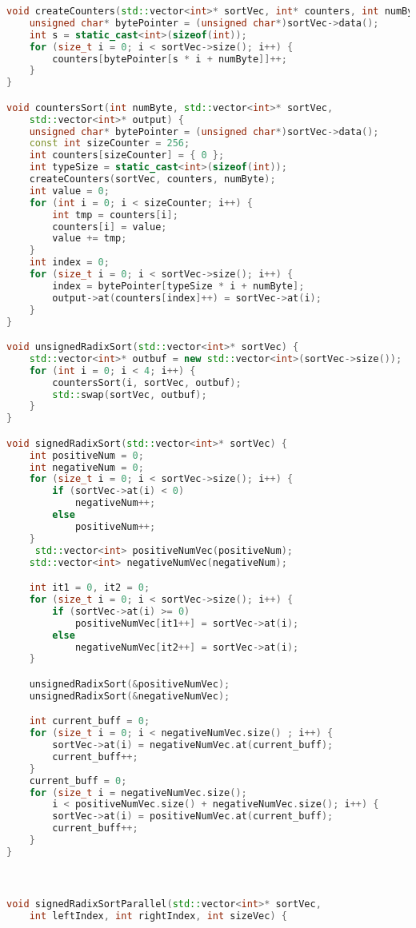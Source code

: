 \documentclass{report}
\begin{document}
\begin{lstlisting}[language=C++]
void createCounters(std::vector<int>* sortVec, int* counters, int numByte) {
    unsigned char* bytePointer = (unsigned char*)sortVec->data();
    int s = static_cast<int>(sizeof(int));
    for (size_t i = 0; i < sortVec->size(); i++) {
        counters[bytePointer[s * i + numByte]]++;
    }
}

void countersSort(int numByte, std::vector<int>* sortVec,
    std::vector<int>* output) {
    unsigned char* bytePointer = (unsigned char*)sortVec->data();
    const int sizeCounter = 256;
    int counters[sizeCounter] = { 0 };
    int typeSize = static_cast<int>(sizeof(int));
    createCounters(sortVec, counters, numByte);
    int value = 0;
    for (int i = 0; i < sizeCounter; i++) {
        int tmp = counters[i];
        counters[i] = value;
        value += tmp;
    }
    int index = 0;
    for (size_t i = 0; i < sortVec->size(); i++) {
        index = bytePointer[typeSize * i + numByte];
        output->at(counters[index]++) = sortVec->at(i);
    }
}

void unsignedRadixSort(std::vector<int>* sortVec) {
    std::vector<int>* outbuf = new std::vector<int>(sortVec->size());
    for (int i = 0; i < 4; i++) {
        countersSort(i, sortVec, outbuf);
        std::swap(sortVec, outbuf);
    }
}

void signedRadixSort(std::vector<int>* sortVec) {
    int positiveNum = 0;
    int negativeNum = 0;
    for (size_t i = 0; i < sortVec->size(); i++) {
        if (sortVec->at(i) < 0)
            negativeNum++;
        else
            positiveNum++;
    }
     std::vector<int> positiveNumVec(positiveNum);
    std::vector<int> negativeNumVec(negativeNum);

    int it1 = 0, it2 = 0;
    for (size_t i = 0; i < sortVec->size(); i++) {
        if (sortVec->at(i) >= 0)
            positiveNumVec[it1++] = sortVec->at(i);
        else
            negativeNumVec[it2++] = sortVec->at(i);
    }

    unsignedRadixSort(&positiveNumVec);
    unsignedRadixSort(&negativeNumVec);

    int current_buff = 0;
    for (size_t i = 0; i < negativeNumVec.size() ; i++) {
        sortVec->at(i) = negativeNumVec.at(current_buff);
        current_buff++;
    }
    current_buff = 0;
    for (size_t i = negativeNumVec.size();
        i < positiveNumVec.size() + negativeNumVec.size(); i++) {
        sortVec->at(i) = positiveNumVec.at(current_buff);
        current_buff++;
    }
}



void signedRadixSortParallel(std::vector<int>* sortVec,
    int leftIndex, int rightIndex, int sizeVec) {


\end{lstlisting}
\end{document}
